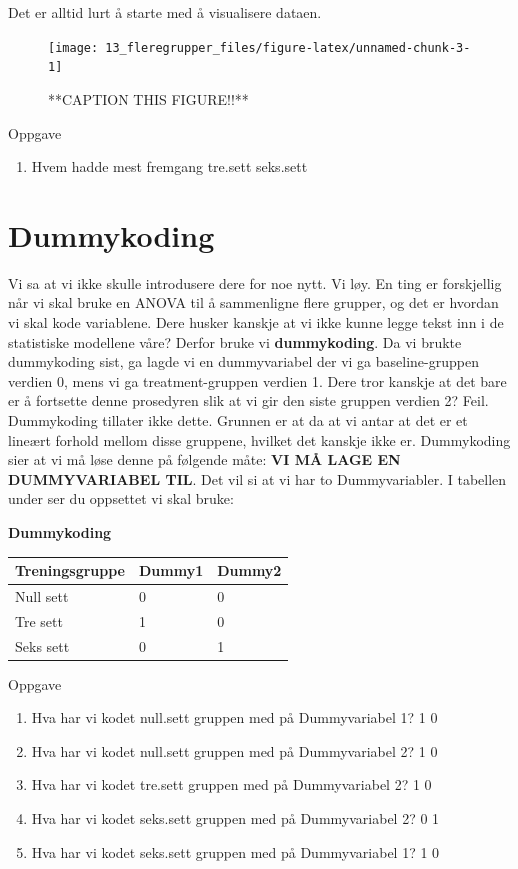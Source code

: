 \documentclass[
]{book}
\providecommand{\tightlist}{%
  \setlength{\itemsep}{0pt}\setlength{\parskip}{0pt}}
\begin{document}
Det er alltid lurt å starte med å visualisere dataen.

\begin{figure}

{\centering \texttt{[image: 13\_fleregrupper\_files/figure-latex/unnamed-chunk-3-1]} 

}

\caption{**CAPTION THIS FIGURE!!**}\label{fig:unnamed-chunk-3}
\end{figure}

{Oppgave}

\begin{enumerate}
\def\labelenumi{\alph{enumi})}
\tightlist
\item
  Hvem hadde mest fremgang tre.sett seks.sett
\end{enumerate}

\hypertarget{dummykoding-1}{%
\section{Dummykoding}\label{dummykoding-1}}

Vi sa at vi ikke skulle introdusere dere for noe nytt. Vi løy. En ting er forskjellig når vi skal bruke en ANOVA til å sammenligne flere grupper, og det er hvordan vi skal kode variablene. Dere husker kanskje at vi ikke kunne legge tekst inn i de statistiske modellene våre? Derfor bruke vi \textbf{dummykoding}. Da vi brukte dummykoding sist, ga lagde vi en dummyvariabel der vi ga baseline-gruppen verdien 0, mens vi ga treatment-gruppen verdien 1. Dere tror kanskje at det bare er å fortsette denne prosedyren slik at vi gir den siste gruppen verdien 2? Feil. Dummykoding tillater ikke dette. Grunnen er at da at vi antar at det er et lineært forhold mellom disse gruppene, hvilket det kanskje ikke er. Dummykoding sier at vi må løse denne på følgende måte: \textbf{VI MÅ LAGE EN DUMMYVARIABEL TIL}. Det vil si at vi har to Dummyvariabler. I tabellen under ser du oppsettet vi skal bruke:

\textbf{Dummykoding}

\begin{longtable}[]{@{}lll@{}}
\toprule
Treningsgruppe & Dummy1 & Dummy2\tabularnewline
\midrule
\endhead
Null sett & 0 & 0\tabularnewline
Tre sett & 1 & 0\tabularnewline
Seks sett & 0 & 1\tabularnewline
\bottomrule
\end{longtable}

{Oppgave}

\begin{enumerate}
\def\labelenumi{\alph{enumi})}
\tightlist
\item
  Hva har vi kodet null.sett gruppen med på Dummyvariabel 1? 1 0
\item
  Hva har vi kodet null.sett gruppen med på Dummyvariabel 2? 1 0
\item
  Hva har vi kodet tre.sett gruppen med på Dummyvariabel 2? 1 0
\item
  Hva har vi kodet seks.sett gruppen med på Dummyvariabel 2? 0 1
\item
  Hva har vi kodet seks.sett gruppen med på Dummyvariabel 1? 1 0
\end{enumerate}
\end{document}
